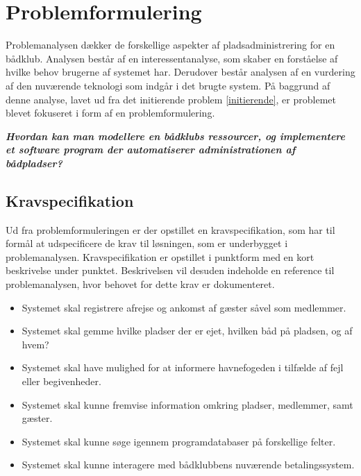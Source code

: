 \chapter{Problemformulering}
\label{cha:problemformulering}


Problemanalysen dækker de forskellige aspekter af pladsadministrering for en bådklub. Analysen består af en interessentanalyse, som skaber en forståelse af hvilke behov brugerne af systemet har. Derudover består analysen af en vurdering af den nuværende teknologi som indgår i det brugte system. På baggrund af denne analyse, lavet ud fra det initierende problem \ref{initierende}, er problemet blevet fokuseret i form af en problemformulering.


\begin{displayquote}
	\textbf{\textit{Hvordan kan man modellere en bådklubs ressourcer, og implementere et software program der automatiserer administrationen af bådpladser?}}
\end{displayquote}

\section{Kravspecifikation} %
\label{sec:Kravspecifikation}

Ud fra problemformuleringen er der opstillet en kravspecifikation, som har til
formål at udspecificere de krav til løsningen, som er underbygget i problemanalysen. 
Kravspecifikation er opstillet i punktform med en kort beskrivelse 
under punktet. Beskrivelsen vil desuden indeholde en reference til problemanalysen, hvor 
behovet for dette krav er dokumenteret.
 

\begin{itemize}
  \item Systemet skal registrere afrejse og ankomst af gæster såvel som medlemmer.
  \item Systemet skal gemme hvilke pladser der er ejet, hvilken båd på pladsen, og af hvem?
  \item Systemet skal have mulighed for at informere havnefogeden i tilfælde af fejl eller begivenheder.
  \item Systemet skal kunne fremvise information omkring pladser, medlemmer, samt gæster.
  \item Systemet skal kunne søge igennem programdatabaser på forskellige felter.	
  \item Systemet skal kunne interagere med bådklubbens nuværende betalingssystem.
\end{itemize}

